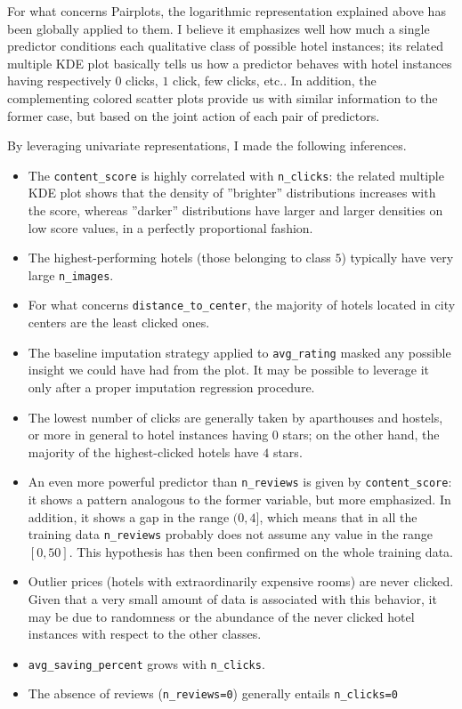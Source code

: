 \documentclass[preprint,12pt,3p]{elsarticle}
\begin{document}
For what concerns Pairplots, the logarithmic representation explained above has been globally applied to them. I believe it emphasizes well how much a single predictor conditions each qualitative class of possible hotel instances; its related multiple KDE plot basically tells us how a predictor behaves with hotel instances having respectively $0$ clicks, $1$ click, few clicks, etc.. In addition, the complementing colored scatter plots provide us with similar information to the former case, but based on the joint action of each pair of predictors.

By leveraging univariate representations, I made the following inferences.
\begin{itemize}
	\item The \verb|content_score| is highly correlated with \verb|n_clicks|: the related multiple KDE plot shows that the density of ''brighter'' distributions increases with the score, whereas ''darker'' distributions have larger and larger densities on low score values, in a perfectly proportional fashion.
	\item The highest-performing hotels (those belonging to class $5$) typically have very large \verb|n_images|.
	\item For what concerns \verb|distance_to_center|, the majority of hotels located in city centers are the least clicked ones.
	\item The baseline imputation strategy applied to \verb|avg_rating| masked any possible insight we could have had from the plot. It may be possible to leverage it only after a proper imputation regression procedure.
	\item The lowest number of clicks are generally taken by aparthouses and hostels, or more in general to hotel instances having $0$ stars; on the other hand, the majority of the highest-clicked hotels have $4$ stars.
	\item An even more powerful predictor than \verb|n_reviews| is given by \verb|content_score|: it shows a pattern analogous to the former variable, but more emphasized. In addition, it shows a gap in the range $(0,4]$, which means that in all the training data \verb|n_reviews| probably does not assume any value in the range $[0,50]$. This hypothesis has then been confirmed on the whole training data.
	\item Outlier prices (hotels with extraordinarily expensive rooms) are never clicked. Given that a very small amount of data is associated with this behavior, it may be due to randomness or the abundance of the never clicked hotel instances with respect to the other classes.
	\item \verb|avg_saving_percent| grows with \verb|n_clicks|.
	\item The absence of reviews (\verb|n_reviews=0|) generally entails \verb|n_clicks=0|
\end{itemize}
\end{document}
